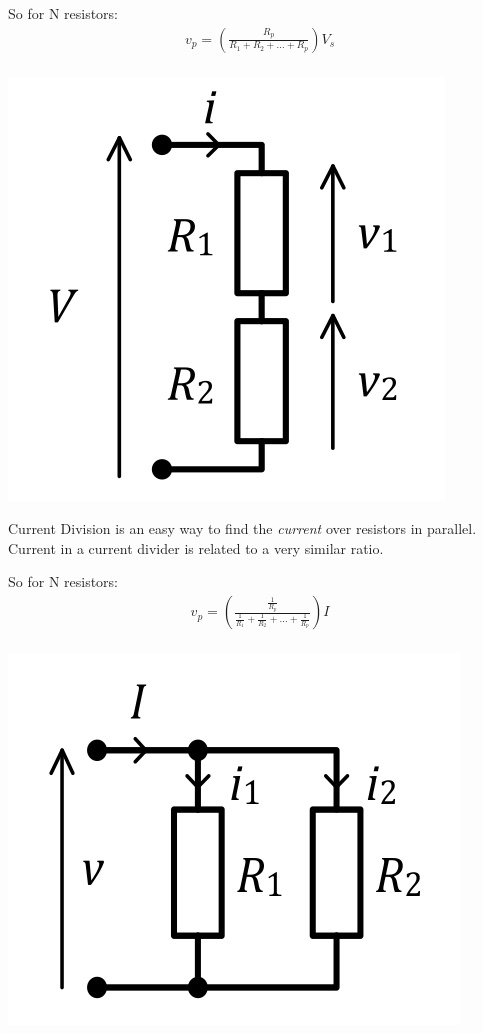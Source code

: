 \documentclass[12pt]{article}
\begin{document}
So for N resistors:
\begin{align*}
  v_p = (\frac{R_p}{R_1 + R_2 + \dots + R_p})V_s \\
\end{align*} 

\begin{marginfigure}
  \vspace{-10cm}

  \includegraphics[scale=0.3]{voltagedivider}
\end{marginfigure}

Current Division is an easy way to find the \textit{current} over resistors in parallel.
Current in a current divider is related to a very similar ratio.

So for N resistors:
\begin{align*}
  v_p = (\frac{\frac{1}{R_p}}{\frac{1}{R_1} + \frac{1}{R_2} + \dots + \frac{1}{R_p}})I \\
\end{align*} 

\begin{marginfigure}
  \vspace{-5cm}

  \includegraphics[scale=0.3]{currentdivider}
\end{marginfigure}
\end{document}
